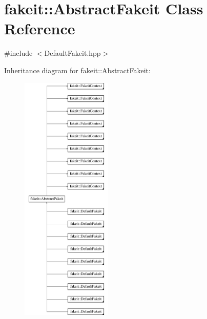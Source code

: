 \hypertarget{classfakeit_1_1AbstractFakeit}{}\section{fakeit\+::Abstract\+Fakeit Class Reference}
\label{classfakeit_1_1AbstractFakeit}


{\ttfamily \#include $<$Default\+Fakeit.\+hpp$>$}

Inheritance diagram for fakeit\+::Abstract\+Fakeit\+:\begin{figure}[H]
\begin{center}
\leavevmode
\includegraphics[height=12.000000cm]{classfakeit_1_1AbstractFakeit}
\end{center}
\end{figure}

